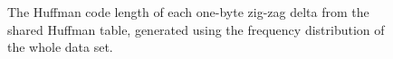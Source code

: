 \begin{figure}
	\centering

\caption{\label{fig:shuff-len}The Huffman code length of each one-byte zig-zag delta from the shared Huffman table, generated using the frequency distribution of the whole data set.}
\end{figure}

